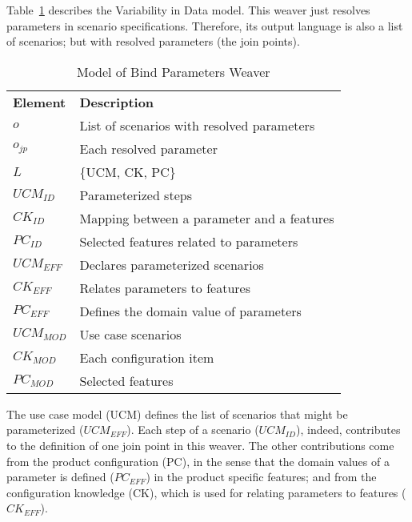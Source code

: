 Table~\ref{tab:bp-weaver} describes the Variability in Data model. This weaver
just resolves parameters in scenario specifications. Therefore, its output
language is also a list of scenarios; but with resolved parameters (the join
points).


\begin{table}[th]
\begin{center}
\caption{Model of Bind Parameters Weaver} \label{tab:bp-weaver}
\begin{tabular}{p{0.7in}p{2.3in}}
   \hline\noalign{\smallskip}
  {\bf Element} & {\bf Description} \\
   \noalign{\smallskip}
   \hline
   \noalign{\smallskip}
   $o$              	& List of scenarios with resolved parameters  \\
   $o_{jp}$      	  	& Each resolved parameter \\
   $L$               	& \{UCM, CK, PC\} \\
   $UCM_{ID}$ 			& Parameterized steps \\
   $CK_{ID}$ 			& Mapping between a parameter and a features \\
   $PC_{ID}$    		& Selected features related to parameters \\
   $UCM_{EFF}$ 			& Declares parameterized scenarios \\
   $CK_{EFF}$ 			& Relates parameters to features \\
   $PC_{EFF}$    		& Defines the domain value of parameters \\
   $UCM_{MOD}$ 			& Use case scenarios \\
   $CK_{MOD}$ 			& Each configuration item \\
   $PC_{MOD}$    		& Selected features \\   
  \hline
  \end{tabular}
\end{center}
\end{table}

The use case model (UCM) defines the list of scenarios that might be
parameterized ($UCM_{EFF}$). Each step of a scenario ($UCM_{ID}$), indeed,
contributes to the definition of one join point in this weaver. The other
contributions come from the product configuration (PC), in the sense that the
domain values of a parameter is defined ($PC_{EFF}$) in the product specific
features; and from the configuration knowledge (CK), which is used for relating
parameters to features ($CK_{EFF}$).



